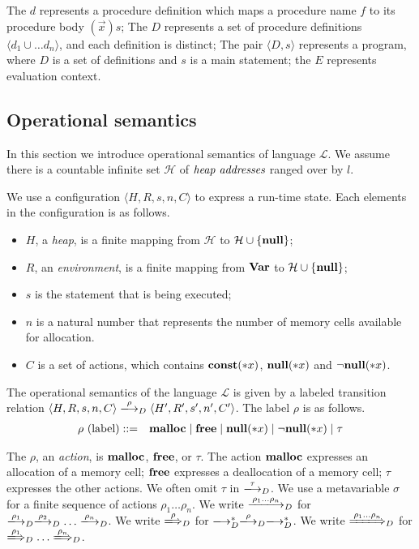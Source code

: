 The \(d\) represents a procedure definition which maps a procedure
name \(f\) to its procedure body \((\vec{x})s\); The \(D\) represents
a set of procedure definitions \(\langle d_1 \cup\dots d_n \rangle\),
and each definition is distinct; The pair \(\langle D, s \rangle \)
represents a program, where \(D\) is a set of definitions and \(s\) is
a main statement; the \(E\) represents evaluation context.

\subsection{Operational semantics}
\label{sec:languageSemantics}
In this section we introduce operational semantics of language
\(\mathcal{L}\). We assume there is a countable infinite set
\(\mathcal{H}\) of \(\emph{heap addresses}\) ranged over by \(l\).

We use a configuration \(\langle H, R, s, n, C \rangle\) to
express a run-time state. Each elements in the configuration is as
follows.

\begin{itemize}
\item \(H\), a \emph{heap}, is a finite mapping from \(\mathcal{H}\)
  to \(\mathcal{H} \cup \{\mathbf{null}\}\);
\item \(R\), an \emph{environment}, is a finite mapping from \(\mathbf{Var}\)
  to \(\mathcal{H} \cup \{\mathbf{null}\}\);
\item \(s\) is the statement that is being executed; 
\item \(n\) is a natural number that represents the number of memory
  cells available for allocation.
\item \(C\) is a set of actions, which contains \(\mathbf{const}(*x)\),
  \({\bf null}(*x)\) and \(\neg{\bf null}(*x)\).
\end{itemize}

The operational semantics of the language \(\mathcal{L}\) is given by
a labeled transition relation \(\langle H, R, s, n, C \rangle
\xlongrightarrow{\rho}_D \langle H', R', s', n', C' \rangle\). The label
\(\rho\) is as follows.
\begin{eqnarray*}
 \rho \mbox{ (label)} &::=& \Malloc \mid \Free \mid \snull \mid \snnull \mid \tau %
\end{eqnarray*}

The \(\rho\), an \emph{action}, is \(\mathbf{malloc}\), \(\mathbf{free}\), or
\(\tau\).  The action \(\mathbf{malloc}\) expresses an allocation of a memory
cell; \(\mathbf{free}\) expresses a deallocation of a memory cell; \(\tau\)
expresses the other actions.  We often omit \(\tau\) in
\(\xlongrightarrow{\tau}_D\).  We use a metavariable \(\sigma\) for a
finite sequence of actions \(\rho_1\dots\rho_n\).  We write
\(\xlongrightarrow{\rho_1\dots\rho_n}_D\) for
\(\xlongrightarrow{\rho_1}_D\xlongrightarrow{\rho_2}_D\dots\xlongrightarrow{\rho_n}_D\).
We write \(\xLongrightarrow{\rho}_D\) for
\(\xlongrightarrow{}_D^*\xlongrightarrow{\rho}_D\xlongrightarrow{}_D^*\).
We write \(\xLongrightarrow{\rho_1\dots\rho_n}_D\) for
\(\xLongrightarrow{\rho_1}_D\dots\xLongrightarrow{\rho_n}_D\).

